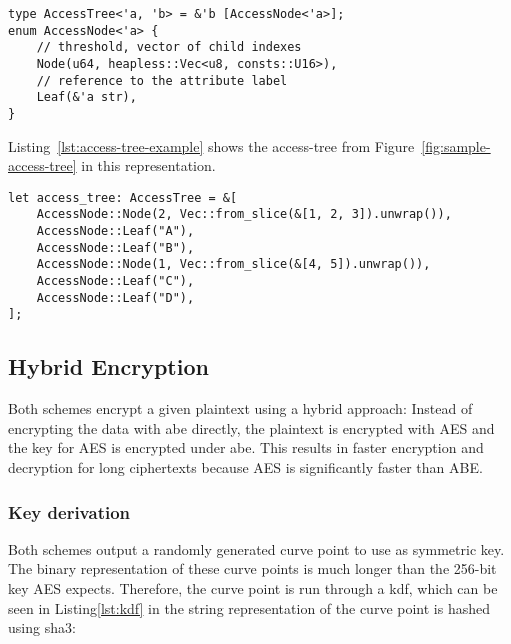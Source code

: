\begin{lstlisting}[caption={Refined implementation of Access Trees (works without standard library)},label={lst:access-tree-heapless}]
type AccessTree<'a, 'b> = &'b [AccessNode<'a>];
enum AccessNode<'a> {
    // threshold, vector of child indexes
    Node(u64, heapless::Vec<u8, consts::U16>),
    // reference to the attribute label
    Leaf(&'a str),
}
\end{lstlisting}

Listing~\ref{lst:access-tree-example} shows the \gls{access-tree} from Figure~\ref{fig:sample-access-tree} in this representation.

\begin{lstlisting}[caption={Sample access tree in the heapless Rust representation},label={lst:access-tree-example}]
let access_tree: AccessTree = &[
    AccessNode::Node(2, Vec::from_slice(&[1, 2, 3]).unwrap()),
    AccessNode::Leaf("A"),
    AccessNode::Leaf("B"),
    AccessNode::Node(1, Vec::from_slice(&[4, 5]).unwrap()),
    AccessNode::Leaf("C"),
    AccessNode::Leaf("D"),
];
\end{lstlisting}

\subsection{Hybrid Encryption}
Both schemes encrypt a given plaintext using a hybrid approach:
Instead of encrypting the data with \acrshort{abe} directly, the plaintext is encrypted with AES and the key for AES is encrypted under \acrshort{abe}.
This results in faster encryption and decryption for long ciphertexts because AES is significantly faster than ABE.


\subsubsection{Key derivation}
Both schemes output a randomly generated curve point to use as symmetric key.
The binary representation of these curve points is much longer than the 256-bit key AES expects.
Therefore, the curve point is run through a \gls{kdf}, which can be seen in Listing\ref{lst:kdf} in the string representation of the curve point is hashed using \acrshort{sha3}:

